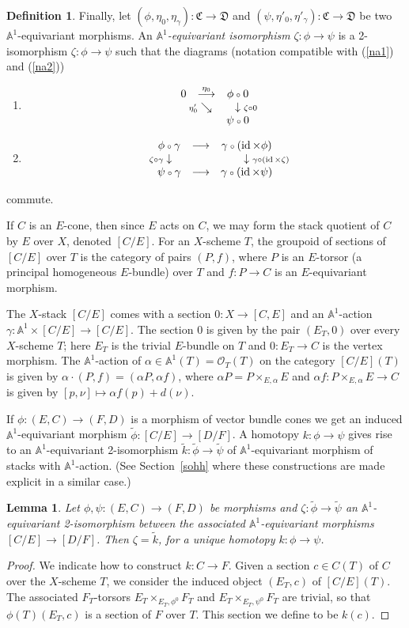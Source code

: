 \documentclass[11pt]{article}
\theoremstyle{plain}
\newtheorem{lem}[prop]{Lemma}
\theoremstyle{definition}
\newtheorem{defnp}[prop]{Definition}
\newenvironment{defn}{\begin{defnp}\normalfont}{\end{defnp}}
\newenvironment{pf}{\begin{proof}}{\end{proof}}
\renewcommand{\tilde}{\widetilde}
\newcommand{\DD}{{\mathfrak{D}}}
\newcommand{\CC}{{\mathfrak{C}}}
\newcommand{\aaa}{{\mathbb{A}}}
\renewcommand{\O}{{\mathcal{O}}}
\newcommand{\id}{\mathop{\rm id}}
\newcommand{\comp}{\mathbin{{\scriptstyle\circ}}}
\newcommand{\ldiag}[1]
       {\makebox[0cm]{\({\scriptstyle#1}\downarrow\phantom{\scriptstyle#1}\)}}
\newcommand{\rdiag}[1]
       {\makebox[0cm]{\(\phantom{\scriptstyle#1}\downarrow{\scriptstyle#1}\)}}
\newcommand{\sediag}[1]
       {\makebox[0cm]{\({\scriptstyle#1}\searrow\phantom{\scriptstyle#1}\)}}
\newcommand{\comdia}[9]{
\begin{array}{ccc}
#1 & \stackrel{#2}{\longrightarrow} & #3 \\
\ldiag{#4} & #5 & \rdiag{#6} \\
#7 & \stackrel{#8}{\longrightarrow} & #9
\end{array}}
\newcommand{\comtri}[6]{
\begin{array}{ccc}
#1 & \stackrel{#2}{\longrightarrow} & #3         \\
   & \sediag{#4}                    & \rdiag{#5} \\
   &                                & #6
\end{array}}
\theoremstyle{plain}
\theoremstyle{definition}
\theoremstyle{remark}
\begin{document}
\begin{defn}
Finally, let \((\phi,\eta_0,\eta_{\gamma}):\CC\to\DD\) and
\((\psi,\eta'_0,\eta'_{\gamma}):\CC\to\DD\) be two \(\aaa^1\)-equivariant
morphisms. An {\em \(\aaa^1\)-equivariant isomorphism
}\(\zeta:\phi\to\psi\) is a 2-isomorphism \(\zeta:\phi\to\psi\) such that
the diagrams (notation compatible with (\ref{na1}) and (\ref{na2}))
\begin{enumerate}
\item
\[
\comtri{0}{\eta_0}{\phi\comp0}
{\eta'_0}{\zeta\comp0}{\psi\comp0}
\]
\item
\[
\comdia{\phi\comp\gamma}{}{\gamma\comp(\id\times\phi)}
{\zeta\comp\gamma}{}{\gamma\comp(\id\times\zeta)}
{\psi\comp\gamma}{}{\gamma\comp(\id\times\psi)}
\]
\end{enumerate}
commute.
\end{defn}

If \(C\) is an \(E\)-cone, then since \(E\) acts on \(C\), we may form the
stack quotient of \(C\) by \(E\) over \(X\), denoted \([C/E]\). For an
\(X\)-scheme \(T\), the groupoid of sections of \([C/E]\) over \(T\) is the
category of pairs \((P,f)\), where \(P\) is an \(E\)-torsor (a principal
homogeneous \(E\)-bundle) over \(T\) and \(f:P\rightarrow C\) is an
\(E\)-equivariant morphism.

The \(X\)-stack \([C/E]\) comes with a section \(0:X\to[C,E]\) and an
\(\aaa^1\)-action \(\gamma:\aaa^1\times[C/E]\to[C/E]\). The section \(0\) is
given by the pair \((E_T,0)\) over every \(X\)-scheme \(T\); here \(E_T\) is
the trivial \(E\)-bundle on \(T\) and \(0:E_T\to C\) is the vertex morphism.
The \(\aaa^1\)-action of \(\alpha\in\aaa^1(T)=\O_T(T)\) on the category
\([C/E](T)\) is given by \(\alpha\cdot(P,f)=(\alpha P,\alpha f)\), where
\(\alpha P=P\times_{E,\alpha} E\) and \(\alpha f:P\times_{E,\alpha} E\to
C\) is given by \([p,\nu]\mapsto \alpha f(p)+d(\nu)\).

If \(\phi:(E,C)\to(F,D)\) is a morphism of vector bundle cones we get an
induced \(\aaa^1\)-equivariant morphism \(\tilde{\phi}:[C/E]\to[D/F]\). A
homotopy \(k:\phi\to\psi\) gives rise to an \(\aaa^1\)-equivariant
2-isomorphism \(\tilde{k}:\tilde{\phi}\to\tilde{\psi}\) of
\(\aaa^1\)-equivariant morphism of stacks with \(\aaa^1\)-action. (See
Section~\ref{sohh} where these constructions are made explicit in a
similar case.)

\begin{lem}\label{lo2i}
Let \(\phi,\psi:(E,C)\to(F,D)\) be morphisms and
\(\zeta:\tilde{\phi}\to\tilde{\psi}\) an \(\aaa^1\)-equivariant
2-isomorphism between the associated \(\aaa^1\)-equivariant morphisms
\([C/E]\to [D/F]\). Then \(\zeta=\tilde{k}\), for a unique
homotopy \(k:\phi\to\psi\).
\end{lem}
\begin{pf}
We indicate how to construct \(k:C\to F\). Given a section \(c\in C(T)\)
of \(C\) over the \(X\)-scheme \(T\), we consider the induced object
\((E_T,c)\) of \([C/E](T)\). The associated \(F_T\)-torsors
\(E_T\times_{E_T,\phi^0}F_T\) and \(E_T\times_{E_T,\psi^0}F_T\) are
trivial, so that \(\phi(T)(E_T,c)\) is a section of \(F\) over \(T\). This
section we define to be \(k(c)\).
\end{pf}
\end{document}
